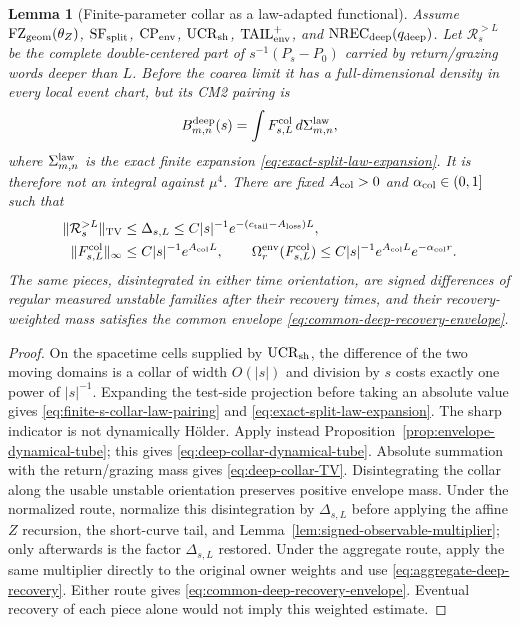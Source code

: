 \documentclass[11pt]{article}
\newtheorem{lemma}[theorem]{Lemma}
\begin{document}
\begin{lemma}[Finite-parameter collar as a law-adapted functional]
\label{lem:finite-s-collar-admissibility}
Assume $\mathrm{FZ}_{\rm geom}(\theta_Z)$,
$\mathrm{SF}_{\rm split}$, $\mathrm{CP}_{\rm env}$,
$\mathrm{UCR}_{\rm sh}$, $\mathrm{TAIL}_{\rm env}^{+}$, and
$\mathrm{NREC}_{\rm deep}(q_{\rm deep})$.
Let $\mathcal R_s^{>L}$ be the complete double-centered part of
$s^{-1}(P_s-P_0)$ carried by return/grazing words deeper than $L$.  Before
the coarea limit it has a full-dimensional density in every local event chart,
but its CM2 pairing is
\begin{equation}
\label{eq:finite-s-collar-law-pairing}
 B^{\rm deep}_{m,n}(s)=
 \int F_{s,L}^{\rm col}\,d\Sigma_{m,n}^{\rm law},
\end{equation}
where $\Sigma_{m,n}^{\rm law}$ is the exact finite expansion
\eqref{eq:exact-split-law-expansion}.  It is therefore not an integral against
$\mu^4$.
There are fixed $A_{\rm col}>0$ and $\alpha_{\rm col}\in(0,1]$ such that
\begin{align}
 \|\mathcal R_s^{>L}\|_{\rm TV}
 &\le \Delta_{s,L}\le C|s|^{-1}e^{-(c_{\rm tail}-A_{\rm loss})L},
 \label{eq:deep-collar-TV}\\
 \|F_{s,L}^{\rm col}\|_\infty
 &\le C|s|^{-1}e^{A_{\rm col}L},\qquad
 \Omega_r^{\rm env}(F_{s,L}^{\rm col})
 \le C|s|^{-1}e^{A_{\rm col}L}e^{-\alpha_{\rm col}r}.
 \label{eq:deep-collar-dynamical-tube}
\end{align}
The same pieces, disintegrated in either time orientation, are signed
differences of regular measured unstable families after their recovery
times, and their recovery-weighted mass satisfies the common envelope
\eqref{eq:common-deep-recovery-envelope}.
\end{lemma}

\begin{proof}
On the spacetime cells supplied by $\mathrm{UCR}_{\rm sh}$, the difference of the two moving domains is
a collar of width $O(|s|)$ and division by $s$ costs exactly one power of
$|s|^{-1}$.  Expanding the test-side projection before taking an absolute
value gives \eqref{eq:finite-s-collar-law-pairing} and
\eqref{eq:exact-split-law-expansion}.  The sharp indicator is not dynamically
H\"older.  Apply instead Proposition~\ref{prop:envelope-dynamical-tube}; this gives
\eqref{eq:deep-collar-dynamical-tube}.  Absolute summation with the
return/grazing mass gives \eqref{eq:deep-collar-TV}.  Disintegrating the collar
along the usable unstable orientation preserves positive envelope mass.
Under the normalized route, normalize this disintegration by
$\Delta_{s,L}$ before applying the affine $Z$ recursion, the short-curve
tail, and Lemma~\ref{lem:signed-observable-multiplier}; only afterwards is
the factor $\Delta_{s,L}$ restored.  Under the aggregate route, apply the
same multiplier directly to the original owner weights and use
\eqref{eq:aggregate-deep-recovery}.  Either route gives
\eqref{eq:common-deep-recovery-envelope}.  Eventual recovery of each piece
alone would not imply this weighted estimate.
\end{proof}
\end{document}
